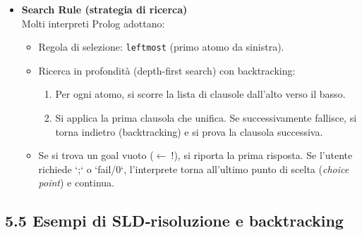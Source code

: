 \documentclass[12pt]{article}
\begin{document}
\begin{itemize}
  \item \textbf{Search Rule (strategia di ricerca)}\\
    Molti interpreti Prolog adottano:
    \begin{itemize}
      \item Regola di selezione: \texttt{leftmost} (primo atomo da sinistra).
      \item Ricerca in profondità (depth-first search) con backtracking:
        \begin{enumerate}
          \item Per ogni atomo, si scorre la lista di clausole dall’alto verso il basso.
          \item Si applica la prima clausola che unifica. Se successivamente fallisce, si torna indietro (backtracking) e si prova la clausola successiva.
        \end{enumerate}
      \item Se si trova un goal vuoto ($\leftarrow\ !$), si riporta la prima risposta. Se l’utente richiede `;` o `fail/0`, l’interprete torna all’ultimo punto di scelta (\emph{choice point}) e continua.
    \end{itemize}
\end{itemize}

\subsection*{5.5 Esempi di SLD‐risoluzione e backtracking}
\end{document}
